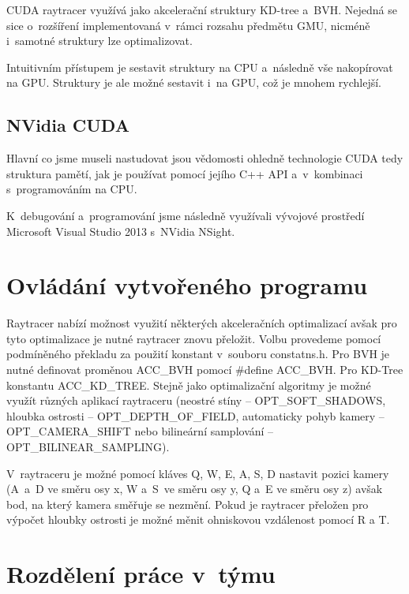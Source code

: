 \documentclass[12pt,a4paper,titlepage,final]{report}
\begin{document}
CUDA raytracer využívá jako akcelerační struktury KD-tree a~BVH. Nejedná se sice o~rozšíření implementovaná v~rámci rozsahu předmětu GMU, nicméně i~samotné struktury lze optimalizovat.

Intuitivním přístupem je sestavit struktury na CPU a~následně vše nakopírovat na GPU. Struktury je ale možné sestavit i~na GPU, což je mnohem rychlejší. \cite{karras}

\subsection{NVidia CUDA}
Hlavní co jsme museli nastudovat jsou vědomosti ohledně technologie CUDA tedy struktura pamětí, jak je používat pomocí jejího C++ API a~v~kombinaci s~programováním na CPU.

K~debugování a~programování jsme následně využívali vývojové prostředí Microsoft Visual Studio 2013 s~NVidia NSight.



\section{Ovládání vytvořeného programu}

Raytracer nabízí možnost využití některých akceleračních optimalizací avšak pro tyto optimalizace je nutné raytracer znovu přeložit. Volbu provedeme pomocí podmíněného překladu za použití konstant v~souboru constatns.h. Pro BVH je nutné definovat proměnou ACC\_BVH pomocí \#define ACC\_BVH. Pro KD-Tree konstantu ACC\_KD\_TREE. Stejně jako optimalizační algoritmy je možné využít různých aplikací raytraceru (neostré  stíny -- OPT\_SOFT\_SHADOWS, hloubka ostrosti -- OPT\_DEPTH\_OF\_FIELD, automaticky pohyb kamery -- OPT\_CAMERA\_SHIFT nebo bilineární samplování -- OPT\_BILINEAR\_SAMPLING). 

V~raytraceru je možné pomocí kláves Q, W, E, A, S, D nastavit pozici kamery (A~a~D ve směru osy x, W a~S~ve směru osy y, Q a~E ve směru osy z) avšak bod, na který kamera směřuje se nezmění. Pokud je raytracer přeložen pro výpočet hloubky ostrosti je možné měnit ohniskovou vzdálenost pomocí R a T.


\section{Rozdělení práce v~týmu}
\end{document}
